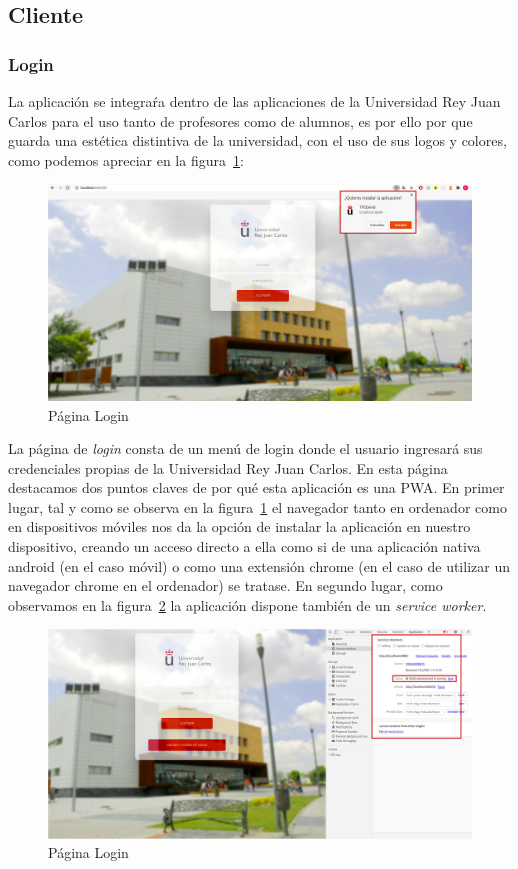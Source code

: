\documentclass[a4paper, 12pt]{book}
\begin{document}
\subsection{Cliente}

\subsubsection{Login}
	La aplicación se integraŕa dentro de las aplicaciones de la Universidad Rey Juan Carlos para el uso tanto de profesores como de alumnos, es por ello por que guarda una estética distintiva de la universidad, con el uso de sus logos y colores, como podemos apreciar en la figura~\ref{fig:principalHome}:
	\begin{figure}
  	\centering
  	\includegraphics[width=16cm, keepaspectratio]{img/principalHome.png}
  	\caption{Página Login}\label{fig:principalHome}
	\end{figure}
La página de \textit{login} consta de un menú de login donde el usuario ingresará sus credenciales propias de la Universidad Rey Juan Carlos. En esta página destacamos dos puntos claves de por qué esta aplicación es una PWA.
	En primer lugar, tal y como se observa en la figura~\ref{fig:principalHome} el navegador tanto en ordenador como en dispositivos móviles nos da la opción de instalar la aplicación en nuestro dispositivo, creando un acceso directo a ella como si de una aplicación nativa android (en el caso móvil) o como una extensión chrome (en el caso de utilizar un navegador chrome en el ordenador) se tratase.
	En segundo lugar, como observamos en la figura~\ref{fig:principalWorker} la aplicación dispone también de un \textit{service worker}.
	
	\begin{figure}
  	\centering
  	\includegraphics[width=16cm, keepaspectratio]{img/principalWorker.png}
  	\caption{Página Login}\label{fig:principalWorker}
	\end{figure}
\end{document}
